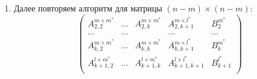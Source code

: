 \documentclass[12pt]{report}
\begin{document}
\begin{enumerate}
            \item \label{alg:repeat} Далее повторяем алгоритм для матрицы $(n - m) \times (n - m)$:
            \[
            \left(
            \begin{array}{cccc|c}
            A_{2,2}^{m \times m^*}     & \ldots & A_{2,k}^{m \times m^*}   & A_{2,k+1}^{m \times l^*}       & B^{m^*}_{2}   \\  
            \ldots                     & \ldots &                          & \ldots                         & \ldots        \\  
            A_{k,2}^{m \times m^*}     & \ldots & A_{k,k}^{m \times m^*}   & A_{k,k+1}^{m \times l^*}       & B^{m^*}_{k}   \\  
            A_{k+1,2}^{l \times m^*}   & \ldots & A_{k+1,k}^{l \times m^*} & A_{k+1, k+1}^{l \times l^*}    & B^{l^*}_{k+1} \\
            \end{array}
            \right)
            \]
        
        \end{enumerate}
            
\end{document}
